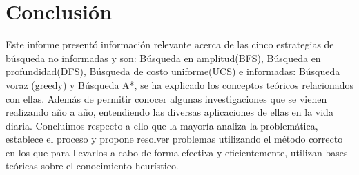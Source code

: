 \documentclass[10pt,conference]{IEEEtran}
\begin{document}
\section{\textbf{Conclusión}}
Este informe presentó información relevante acerca de las cinco estrategias de búsqueda no informadas y son: Búsqueda en amplitud(BFS), Búsqueda en profundidad(DFS), Búsqueda de costo uniforme(UCS) e informadas: Búsqueda voraz (greedy) y Búsqueda A*, se ha explicado los conceptos teóricos relacionados con ellas. Además de permitir conocer algunas investigaciones que se vienen realizando año a año, entendiendo las diversas aplicaciones de ellas en la vida diaria. Concluimos respecto a ello que la mayoría analiza la problemática, establece el proceso y propone resolver problemas utilizando el método correcto en los que para llevarlos a cabo de forma efectiva y eficientemente, utilizan bases teóricas sobre el conocimiento heurístico.
\medskip

\end{document}
